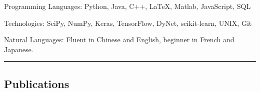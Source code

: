 \documentclass[10pt,letterpaper]{article}
\makeatletter
\newenvironment{indentsection}[1]%
{\begin{list}{}%
	{\setlength{\leftmargin}{#1}}%
	\item[]%
}
{\end{list}}
\newcommand{\headerrow}[2]
{\begin{tabular*}{\linewidth}{l@{\extracolsep{\fill}}r}
	#1 &
	#2 \\
\end{tabular*}}
\makeatother
\begin{document}
\begin{indentsection}{\parindent}
\begin{description*}
	\item[Programming Languages:]
	Python, Java, C++, \LaTeX, Matlab, JavaScript, SQL
	\item[Technologies:]
	SciPy, NumPy, Keras, TensorFlow, DyNet, scikit-learn, UNIX, Git
	\item[Natural Languages:]
	Fluent in Chinese and English, beginner in French and Japanese.
\end{description*}
\end{indentsection}

%
%

\hrule
\vspace{-0.4em}
\subsection*{Publications}
\end{document}
